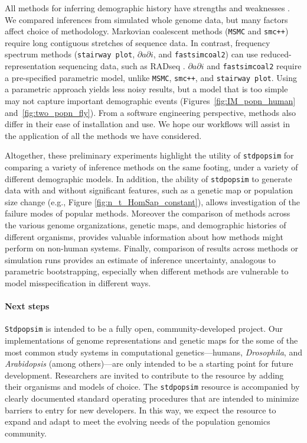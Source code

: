 \documentclass[12pt,halfline,a4paper]{ouparticle}
\newcommand{\Stdpopsim}{\texttt{Stdpopsim}\xspace}
\newcommand{\stdpopsim}{\texttt{stdpopsim}\xspace}
\newcommand{\dadi}{$\partial a \partial i$\xspace}
\newcommand{\MSMC}{\texttt{MSMC}\xspace}
\newcommand{\smcpp}{\texttt{smc++}\xspace}
\newcommand{\stairwayplot}{\texttt{stairway plot}\xspace}
\newcommand{\fastsimcoal}{\texttt{fastsimcoal2}\xspace}
\begin{document}
All methods for inferring demographic history have strengths and weaknesses \citep[as recently reviewed by][]{beichman2018review}.
We compared inferences from simulated whole genome data, but many factors affect choice of methodology.
Markovian coalescent methods (\MSMC and \smcpp) require long contiguous stretches of sequence data.
In contrast, frequency spectrum methods (\stairwayplot, \dadi, and \fastsimcoal) can use reduced-representation sequencing data, such as RADseq \citep{andrews2016radseq}.
\dadi and \fastsimcoal require a pre-specified parametric model, unlike \MSMC, \smcpp, and \stairwayplot.
Using a parametric approach yields less noisy results, but a model that is too simple may not capture important demographic events (Figures~\ref{fig:IM_popn_human} and~\ref{fig:two_popn_fly}).
From a software engineering perspective, methods also differ in their ease of installation and use.
We hope our workflows will assist in the application of all the methods we have considered.

Altogether, these preliminary experiments highlight
the utility of \stdpopsim for comparing a variety of inference methods on
the same footing, under a variety of different demographic models.
In addition, the ability of \stdpopsim to generate data with and without significant features, such
as a genetic map or population size change (e.g., Figure \ref{fig:n_t_HomSap_constant}), allows
investigation of the failure modes of popular methods.
Moreover the comparison of methods across the various genome organizations, genetic maps,
and demographic histories of different organisms, provides valuable information
about how methods might perform on non-human systems.
Finally, comparison of results across methods or simulation runs
provides an estimate of inference uncertainty, analogous to parametric bootstrapping,
especially when different methods are vulnerable to model misspecification in different ways.

\paragraph{Next steps}
\Stdpopsim is intended to be a fully open, community-developed project.
Our implementations of genome representations and genetic maps for the some of
the most common study systems in computational genetics---humans, \textit{Drosophila},
and \textit{Arabidopsis} (among others)---are only intended to be a starting point for
future development.  
Researchers are invited to contribute to the resource by adding their
organisms and models of choice. The \stdpopsim resource is
accompanied by clearly documented standard operating procedures that are
intended to minimize barriers to entry for new developers.  In this way, we
expect the resource to expand and adapt to meet the evolving needs of the
population genomics community.
\end{document}
